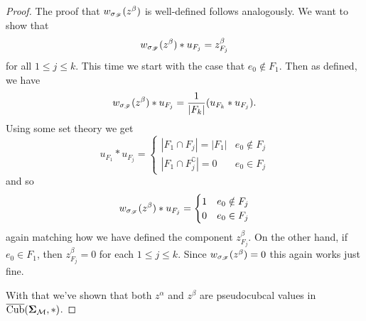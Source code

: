 \documentclass[12pt,oneside]{../../sfsuthesis}
\begin{document}
\begin{proof}
    The proof that \(  w_{\sigma_{\mathscr{F}}}(z^\beta) \) is well-defined follows analogously.
    We want to show that
    \begin{align*}
        w_{\sigma_{\mathscr{F}}}(z^\beta) \ast u_{F_j} = z^\beta_{F_j}
    \end{align*}
    for all \( 1 \leq j \leq k \).
    This time we start with the case that \( e_0 \notin F_1 \).
    Then as defined, we have
    \[
        w_{\sigma_{\mathscr{F}}}(z^\beta) \ast u_{F_j} = {\frac{1}{|F_k|}}(u_{F_k} \ast u_{F_j}).
    \]
    Using some set theory we get
    \[
        u_{F_1} \ast u_{F_j} =
        \begin{cases}
            |F_1 \cap F_j| = |F_1|         & e_0 \notin F_j \\
            |F_1 \cap F_j^\complement| = 0 & e_0 \in F_j
        \end{cases}
    \]
    and so
    \[
        w_{\sigma_{\mathscr{F}}}(z^\beta) \ast u_{F_j} = \begin{cases}
            1 & e_0 \notin F_j \\
            0 & e_0 \in F_j
        \end{cases}
    \]
    again matching how we have defined the component \( z^\beta_{F_j} \).
    On the other hand, if \( e_0 \in F_1 \), then \( z^\beta_{F_j} = 0 \) for each \( 1 \leq j \leq k \).
    Since \( w_{\sigma_{\mathscr{F}}}(z^\beta) = 0 \) this again works just fine.

    With that we've shown that both \( z^\alpha \) and \( z^\beta \) are pseudocubcal values in \( \operatorname{\overline{Cub}}(\bm{\Sigma}_{\mathcal{M}}, \ast) \).
\end{proof}
\end{document}
